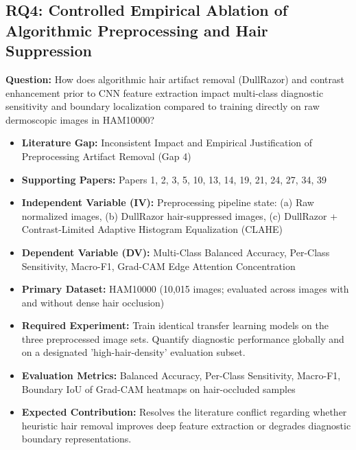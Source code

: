 \documentclass[11pt,a4paper]{article}
\begin{document}
\subsection{RQ4: Controlled Empirical Ablation of Algorithmic Preprocessing and Hair Suppression}
\textbf{Question:} How does algorithmic hair artifact removal (DullRazor) and contrast enhancement prior to CNN feature extraction impact multi-class diagnostic sensitivity and boundary localization compared to training directly on raw dermoscopic images in HAM10000?
\begin{itemize}
\item \textbf{Literature Gap:} Inconsistent Impact and Empirical Justification of Preprocessing Artifact Removal (Gap 4)
\item \textbf{Supporting Papers:} Papers 1, 2, 3, 5, 10, 13, 14, 19, 21, 24, 27, 34, 39
\item \textbf{Independent Variable (IV):} Preprocessing pipeline state: (a) Raw normalized images, (b) DullRazor hair-suppressed images, (c) DullRazor + Contrast-Limited Adaptive Histogram Equalization (CLAHE)
\item \textbf{Dependent Variable (DV):} Multi-Class Balanced Accuracy, Per-Class Sensitivity, Macro-F1, Grad-CAM Edge Attention Concentration
\item \textbf{Primary Dataset:} HAM10000 (10,015 images; evaluated across images with and without dense hair occlusion)
\item \textbf{Required Experiment:} Train identical transfer learning models on the three preprocessed image sets. Quantify diagnostic performance globally and on a designated 'high-hair-density' evaluation subset.
\item \textbf{Evaluation Metrics:} Balanced Accuracy, Per-Class Sensitivity, Macro-F1, Boundary IoU of Grad-CAM heatmaps on hair-occluded samples
\item \textbf{Expected Contribution:} Resolves the literature conflict regarding whether heuristic hair removal improves deep feature extraction or degrades diagnostic boundary representations.
\end{itemize}
\end{document}
